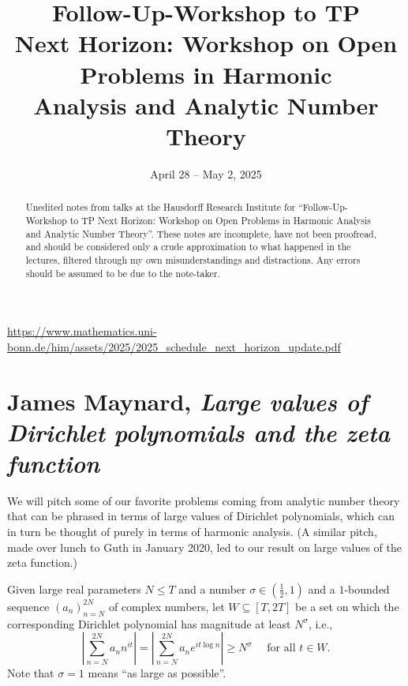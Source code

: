 \documentclass[reqno]{amsart} 
\numberwithin{theorem}{section}
\numberwithin{equation}{section}
\begin{document}
\title{Follow-Up-Workshop to TP \\
  Next Horizon: Workshop on Open Problems in Harmonic \\
  Analysis and Analytic Number Theory}

\begin{abstract}
  Unedited notes from talks at the Hausdorff Research Institute for ``Follow-Up-Workshop to TP Next Horizon: Workshop on Open Problems in Harmonic Analysis and Analytic Number Theory''.  These notes are incomplete, have not been proofread, and should be considered only a crude approximation to what happened in the lectures, filtered through my own misunderstandings and distractions.  Any errors should be assumed to be due to the note-taker.
\end{abstract}

\date{April 28 -- May 2, 2025}

\maketitle

\tableofcontents

\url{https://www.mathematics.uni-bonn.de/him/assets/2025/2025_schedule_next_horizon_update.pdf}

\section{James Maynard, \textnormal{\emph{Large values of Dirichlet polynomials and the zeta function}}}

We will pitch some of our favorite problems coming from analytic number theory that can be phrased in terms of large values of Dirichlet polynomials, which can in turn be thought of purely in terms of harmonic analysis.  (A similar pitch, made over lunch to Guth in January 2020, led to our result on large values of the zeta function.)

Given large real parameters $N \leq T$ and a number $\sigma \in(\tfrac{1}{2}, 1)$ and a $1$-bounded sequence $(a_n)_{n=N}^{2 N}$ of complex numbers, let $W \subseteq[T, 2 T]$ be a set on which the corresponding Dirichlet polynomial has magnitude at least $N^\sigma$, i.e.,
\begin{equation*}
  \left\lvert   \sum_{n = N}^{2 N} a_n n^{i t} \right\rvert = \left\lvert  \sum_{n = N}^{2 N} a_n e^{i t \log n} \right\rvert
  \geq N^\sigma
  \quad
  \text{ for all } t \in W.
\end{equation*}
Note that $\sigma = 1$ means ``as large as possible''.
\end{document}
